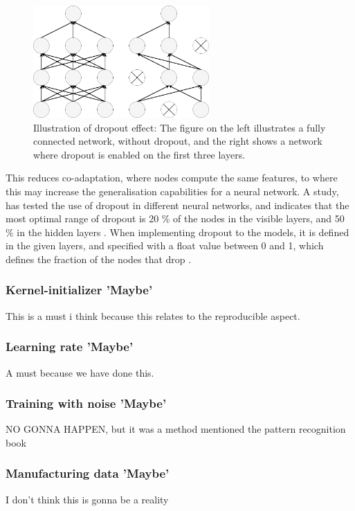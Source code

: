 \begin{figure} [H]
\centering
\includegraphics[width=0.6\textwidth]{figures/Dropout}
\caption{Illustration of dropout effect: The figure on the left illustrates a fully connected network, without dropout, and the right shows a network where dropout is enabled on the first three layers.}
\label{fig:Dropout}  
\end{figure}

This reduces co-adaptation, where nodes compute the same features, to where this may increase the generalisation capabilities for a neural network.\citep{Srivastava2014}  
A study, has tested the use of dropout in different neural networks, and indicates that the most optimal range of dropout is 20 \% of the nodes in the visible layers, and 50 \% in the hidden layers \citep{Srivastava2014}.
When implementing dropout to the models, it is defined in the given layers, and specified with a float value between 0 and 1, which defines the fraction of the nodes that drop \citep{Chollet2015}.



\subsubsection{Kernel-initializer 'Maybe'}
This is a must i think because this relates to the reproducible aspect. 

\subsubsection{Learning rate 'Maybe'}
A must because we have done this. 

\subsubsection{Training with noise 'Maybe'}
NO GONNA HAPPEN, but it was a method mentioned the pattern recognition book

\subsubsection{Manufacturing data 'Maybe'}
I don't think this is gonna be a reality 

